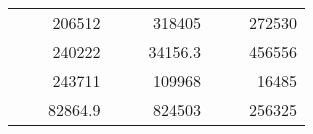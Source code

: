 \begin{table}[H]
\begin{tabular}{|ccrccrccc}
\rowcolor[HTML]{DAE8FC} 
\multicolumn{1}{|c|}{\cellcolor[HTML]{FFFFC7}}                                & \multicolumn{1}{c|}{\cellcolor[HTML]{DAE8FC}}                      & \multicolumn{1}{r|}{\cellcolor[HTML]{DAE8FC}206512}    & \multicolumn{1}{c|}{\cellcolor[HTML]{FFFFC7}}                                & \multicolumn{1}{c|}{\cellcolor[HTML]{DAE8FC}}                       & \multicolumn{1}{r|}{\cellcolor[HTML]{DAE8FC}318405}    & \multicolumn{1}{c|}{\cellcolor[HTML]{FFFFC7}}                                & \multicolumn{1}{c|}{\cellcolor[HTML]{DAE8FC}}                      & \multicolumn{1}{r|}{\cellcolor[HTML]{DAE8FC}272530}    \\ \cline{3-3} \cline{6-6} \cline{9-9} 
\multicolumn{1}{|c|}{\cellcolor[HTML]{FFFFC7}}                                & \multicolumn{1}{c|}{\cellcolor[HTML]{DAE8FC}}                      & \multicolumn{1}{r|}{\cellcolor[HTML]{DDFDFF}240222}    & \multicolumn{1}{c|}{\cellcolor[HTML]{FFFFC7}}                                & \multicolumn{1}{c|}{\cellcolor[HTML]{DAE8FC}}                       & \multicolumn{1}{r|}{\cellcolor[HTML]{DDFDFF}34156.3}   & \multicolumn{1}{c|}{\cellcolor[HTML]{FFFFC7}}                                & \multicolumn{1}{c|}{\cellcolor[HTML]{DAE8FC}}                      & \multicolumn{1}{r|}{\cellcolor[HTML]{DDFDFF}456556}    \\ \cline{3-3} \cline{6-6} \cline{9-9} 
\rowcolor[HTML]{DAE8FC} 
\multicolumn{1}{|c|}{\cellcolor[HTML]{FFFFC7}}                                & \multicolumn{1}{c|}{\cellcolor[HTML]{DAE8FC}}                      & \multicolumn{1}{r|}{\cellcolor[HTML]{DAE8FC}243711}    & \multicolumn{1}{c|}{\cellcolor[HTML]{FFFFC7}}                                & \multicolumn{1}{c|}{\cellcolor[HTML]{DAE8FC}}                       & \multicolumn{1}{r|}{\cellcolor[HTML]{DAE8FC}109968}    & \multicolumn{1}{c|}{\cellcolor[HTML]{FFFFC7}}                                & \multicolumn{1}{c|}{\cellcolor[HTML]{DAE8FC}}                      & \multicolumn{1}{r|}{\cellcolor[HTML]{DAE8FC}16485}     \\ \cline{3-3} \cline{6-6} \cline{9-9} 
\multicolumn{1}{|c|}{\cellcolor[HTML]{FFFFC7}}                                & \multicolumn{1}{c|}{\cellcolor[HTML]{DAE8FC}}                      & \multicolumn{1}{r|}{\cellcolor[HTML]{DDFDFF}82864.9}   & \multicolumn{1}{c|}{\cellcolor[HTML]{FFFFC7}}                                & \multicolumn{1}{c|}{\cellcolor[HTML]{DAE8FC}}                       & \multicolumn{1}{r|}{\cellcolor[HTML]{DDFDFF}824503}    & \multicolumn{1}{c|}{\cellcolor[HTML]{FFFFC7}}                                & \multicolumn{1}{c|}{\cellcolor[HTML]{DAE8FC}}                      & \multicolumn{1}{r|}{\cellcolor[HTML]{DDFDFF}256325}    \\ \cline{3-3} \cline{6-6} \cline{9-9} 

\end{tabular}
\end{table}
